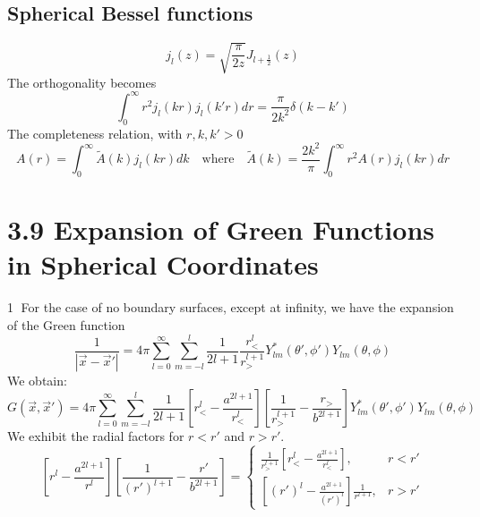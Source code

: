 \documentclass{article}
\begin{document}
	\subsection*{Spherical Bessel functions}
	\begin{equation*}
		j_l(z) = \sqrt{\frac{\pi}{2z}} J_{l+\frac{1}{2}}(z)
	\end{equation*}
	The orthogonality becomes
	\begin{equation*}
		\int_0^\infty r^2 j_l(kr) j_l(k'r) dr = \frac{\pi}{2k^2} \delta(k-k')
	\end{equation*}
	The completeness relation, with $r, k, k' > 0$
	\begin{equation*}
		A(r) = \int_0^\infty \tilde{A}(k) j_l(kr) dk \quad \text{where} \quad \tilde{A}(k) = \frac{2k^2}{\pi} \int_0^\infty r^2 A(r) j_l(kr) dr
	\end{equation*}
	
	\section*{3.9 Expansion of Green Functions in Spherical Coordinates}
	\textcircled{1} For the case of no boundary surfaces, except at infinity, we have the expansion of the Green function
	\begin{equation*}
		\frac{1}{|\vec{x}-\vec{x}'|} = 4\pi \sum_{l=0}^\infty \sum_{m=-l}^l \frac{1}{2l+1} \frac{r_<^l}{r_>^{l+1}} Y_{lm}^*(\theta', \phi') Y_{lm}(\theta, \phi)
	\end{equation*}
	We obtain:
	\begin{equation*}
		G(\vec{x}, \vec{x}') = 4\pi \sum_{l=0}^\infty \sum_{m=-l}^l \frac{1}{2l+1} \left[r_<^l - \frac{a^{2l+1}}{r_<^l}\right] \left[\frac{1}{r_>^{l+1}} - \frac{r_>}{b^{2l+1}}\right] Y_{lm}^*(\theta', \phi') Y_{lm}(\theta, \phi)
	\end{equation*}
	We exhibit the radial factors for $r<r'$ and $r>r'$.
	\begin{equation*}
		\left[ r^l - \frac{a^{2l+1}}{r^l} \right] \left[ \frac{1}{(r')^{l+1}} - \frac{r'}{b^{2l+1}} \right] =
		\begin{cases}
			\frac{1}{r_>^{l+1}} \left[ r_<^l - \frac{a^{2l+1}}{r_<^l} \right], & r<r' \\
			\left[ (r')^l - \frac{a^{2l+1}}{(r')^l} \right] \frac{1}{r^{l+1}}, & r>r'
		\end{cases}
	\end{equation*}
	
\end{document}
